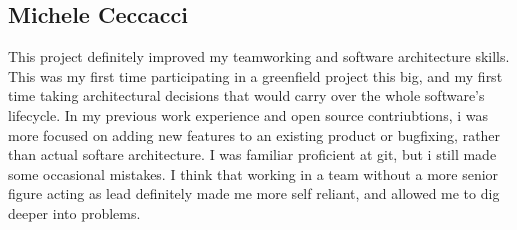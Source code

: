 \subsection{Michele Ceccacci}
This project definitely improved my teamworking and software architecture skills. 
This was my first time participating in a greenfield project this big, and my first time 
taking architectural decisions that would carry over the whole software's lifecycle. 
In my previous work experience and open source contriubtions, i was more focused on  adding new features 
to an existing product or bugfixing, rather than actual softare architecture.
I was familiar proficient at git, but i still made some occasional mistakes.
I think that working in a team without a more senior figure acting as lead definitely 
made me more self reliant, and allowed me to dig deeper into problems.
